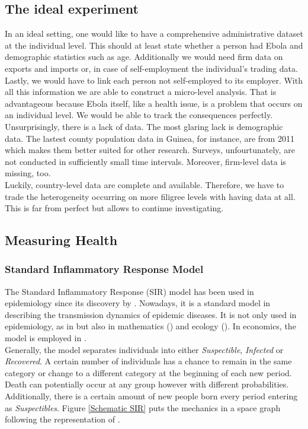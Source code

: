 \documentclass{article}
\begin{document}
\subsection{The ideal experiment}
In an ideal setting, one would like to have a comprehensive administrative dataset at the individual level. This should at least state whether a person had Ebola and demographic statistics such as age. Additionally we would need firm data on exports and imports or, in case of self-employment the individual's trading data. Lastly, we would have to link each person not self-employed to its employer. With all this information we are able to construct a micro-level analysis. That is advantageous because Ebola itself, like a health issue, is a problem that occurs on an individual level. We would be able to track the consequences perfectly.\\
Unsurprisingly, there is a lack of data. The most glaring lack is demographic data. The lastest county population data in Guinea, for instance, are from 2011 which makes them better suited for other research. Surveys, unfourtunately, are not conducted in sufficiently small time intervals.
Moreover, firm-level data is missing, too. \\
Luckily, country-level data are complete and available. Therefore, we have to trade the heterogeneity occurring on more filigree levels with having data at all. This is far from perfect but allows to continue investigating.\\

\subsection{Measuring Health}

\subsubsection{Standard Inflammatory Response Model}

The Standard Inflammatory Response (SIR) model has been used in epidemiology since its discovery by \cite{kermack1927contribution}. Nowadays, it is a standard model in describing the transmission dynamics of epidemic diseases. It is not only used in epidemiology, as in \cite{shulgin1998pulse} but also in mathematics (\cite{mccluskey2010complete})  and ecology (\cite{bjornstad2002dynamics}). In economics, the model is employed in \cite{hansen2017preventing}. \\
Generally, the model separates individuals into either \textit{Suspectible}, \textit{Infected} or \textit{Recovered}. A certain number of individuals has a chance to remain in the same category or change to a different category at the beginning of each new period. Death can potentially occur at any group however with different probabilities. Additionally, there is a certain amount of new people born every period entering as \textit{Suspectibles}. Figure \ref{Schematic SIR} puts the mechanics in a space graph following the representation of \cite{bhattacharya2013health}.
\end{document}
